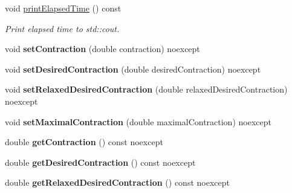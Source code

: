 \begin{DoxyCompactItemize}
\item 
void \hyperlink{classSpacy_1_1Mixin_1_1Timer_a3b79b35213702118d0823f6040d5a315}{print\+Elapsed\+Time} () const\hypertarget{classSpacy_1_1Mixin_1_1Timer_a3b79b35213702118d0823f6040d5a315}{}\label{classSpacy_1_1Mixin_1_1Timer_a3b79b35213702118d0823f6040d5a315}

\begin{DoxyCompactList}\small\item\em Print elapsed time to std\+::cout. \end{DoxyCompactList}\item 
void {\bfseries set\+Contraction} (double contraction) noexcept\hypertarget{classSpacy_1_1Mixin_1_1ContractionRate_a962ded1f772cd3bb50d908f4a2c6b719}{}\label{classSpacy_1_1Mixin_1_1ContractionRate_a962ded1f772cd3bb50d908f4a2c6b719}

\item 
void {\bfseries set\+Desired\+Contraction} (double desired\+Contraction) noexcept\hypertarget{classSpacy_1_1Mixin_1_1ContractionRate_a765b52bc67df54bb8308015ddc5c926d}{}\label{classSpacy_1_1Mixin_1_1ContractionRate_a765b52bc67df54bb8308015ddc5c926d}

\item 
void {\bfseries set\+Relaxed\+Desired\+Contraction} (double relaxed\+Desired\+Contraction) noexcept\hypertarget{classSpacy_1_1Mixin_1_1ContractionRate_a9a80f5f3a6b98d57f8c1ef91609c685f}{}\label{classSpacy_1_1Mixin_1_1ContractionRate_a9a80f5f3a6b98d57f8c1ef91609c685f}

\item 
void {\bfseries set\+Maximal\+Contraction} (double maximal\+Contraction) noexcept\hypertarget{classSpacy_1_1Mixin_1_1ContractionRate_a52e5af055015fc8248da200cfbcd12aa}{}\label{classSpacy_1_1Mixin_1_1ContractionRate_a52e5af055015fc8248da200cfbcd12aa}

\item 
double {\bfseries get\+Contraction} () const noexcept\hypertarget{classSpacy_1_1Mixin_1_1ContractionRate_a493fe0b56583eed0d871ab0913702756}{}\label{classSpacy_1_1Mixin_1_1ContractionRate_a493fe0b56583eed0d871ab0913702756}

\item 
double {\bfseries get\+Desired\+Contraction} () const noexcept\hypertarget{classSpacy_1_1Mixin_1_1ContractionRate_a63ae4d2732c9e5b2093f41548dd6bacf}{}\label{classSpacy_1_1Mixin_1_1ContractionRate_a63ae4d2732c9e5b2093f41548dd6bacf}

\item 
double {\bfseries get\+Relaxed\+Desired\+Contraction} () const noexcept\hypertarget{classSpacy_1_1Mixin_1_1ContractionRate_a972a98575ac502dd0e66ac47d4e2da64}{}\label{classSpacy_1_1Mixin_1_1ContractionRate_a972a98575ac502dd0e66ac47d4e2da64}


\end{DoxyCompactItemize}
